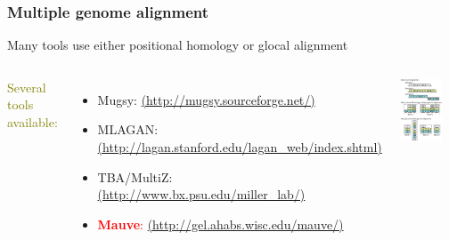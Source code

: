 %
\begin{frame}
  \frametitle{Multiple genome alignment}
  Many tools use either positional homology or glocal alignment
  \begin{columns}[T] 
      \textcolor{olive}{Several tools available:}
      \begin{itemize}
        \item Mugsy: {\tiny\href{http://mugsy.sourceforge.net/}{(http://mugsy.sourceforge.net/)}}
        \item \textcolor{hutton_blue}{MLAGAN: {\tiny\href{http://lagan.stanford.edu/lagan_web/index.shtml}{(http://lagan.stanford.edu/lagan\_web/index.shtml)}}}
        \item TBA/MultiZ: {\tiny\href{http://www.bx.psu.edu/miller_lab/}{(http://www.bx.psu.edu/miller\_lab/)}}
        \item \textcolor{red}{\textbf{Mauve}: {\tiny\href{http://gel.ahabs.wisc.edu/mauve/}{(http://gel.ahabs.wisc.edu/mauve/)}}}
      \end{itemize}
      \includegraphics[width=0.75\textwidth]{images/poshom_v_glocal}
  \end{columns}    
\end{frame}

